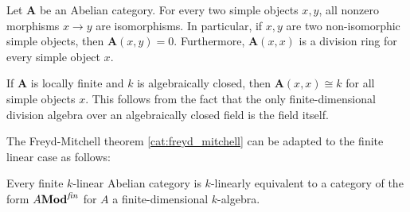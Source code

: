 
    \begin{theorem}\label{cat:schur_lemma}
        Let $\mathbf{A}$ be an Abelian category. For every two simple objects $x,y$, all nonzero morphisms $x\rightarrow y$ are isomorphisms. In particular, if $x,y$ are two non-isomorphic simple objects, then $\mathbf{A}(x,y)=0$. Furthermore, $\mathbf{A}(x,x)$ is a division ring for every simple object $x$.
    \end{theorem}
    \begin{result}
        If $\mathbf{A}$ is locally finite and $k$ is algebraically closed, then $\mathbf{A}(x,x)\cong k$ for all simple objects $x$. This follows from the fact that the only finite-dimensional division algebra over an algebraically closed field is the field itself.
    \end{result}

    The Freyd-Mitchell theorem \ref{cat:freyd_mitchell} can be adapted to the finite linear case as follows:
    \begin{theorem}[Deligne]
        Every finite $k$-linear Abelian category is $k$-linearly equivalent to a category of the form $A\mathbf{Mod}^{\text{\emph{fin}}}$ for $A$ a finite-dimensional $k$-algebra.
    \end{theorem}


